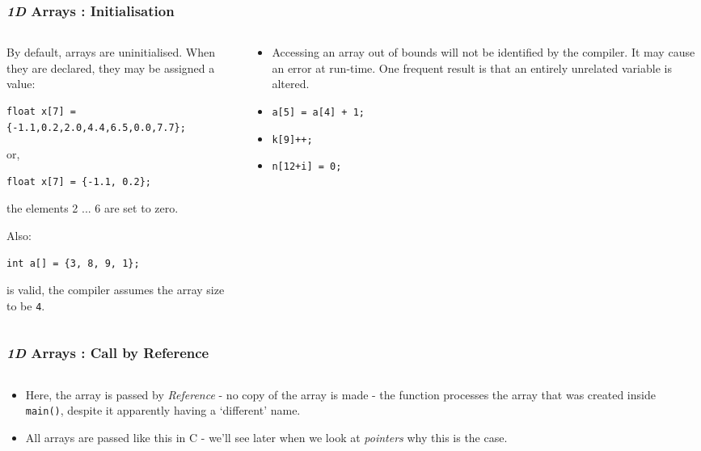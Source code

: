 \begin{frame}[fragile]
\frametitle{{\em 1D} Arrays : Initialisation}
\begin{columns}

\begin{column}{0.45\textwidth}
By default, arrays are uninitialised.
When they are declared, they may be assigned a value:
{\small
\begin{verbatim}
float x[7] = {-1.1,0.2,2.0,4.4,6.5,0.0,7.7};
\end{verbatim}
}
or,
{\small
\begin{verbatim}
float x[7] = {-1.1, 0.2};
\end{verbatim}
}
the elements 2 ... 6 are set to zero.

Also:
{\small
\begin{verbatim}
int a[] = {3, 8, 9, 1};
\end{verbatim}
}
is valid, the compiler assumes the array size to be \verb^4^.
\end{column}

\begin{column}{0.45\textwidth}
\begin{itemize}
\item Accessing an array out of bounds will not be identified by
the compiler. It may cause an error at run-time.
One frequent result is that an entirely unrelated variable
is altered.
\item \verb^a[5] = a[4] + 1;^
\item \verb^k[9]++;^
\item \verb^n[12+i] = 0;^
\end{itemize}
\end{column}

\end{columns}
\end{frame}



\begin{frame}[fragile]
\frametitle{{\em 1D} Arrays : Call by Reference}
\begin{columns}

\begin{column}{0.35\textwidth}
\begin{itemize}
\item Here, the array is passed by {\em Reference} - no copy of
the array is made - the function processes the array that was created inside \verb^main()^, despite
it apparently having a `different' name.
\item All arrays are passed like this in C - we'll see later when we look at {\em pointers} why this is the case.
\end{itemize}
\end{column}

\begin{column}{0.55\textwidth}

\end{column}

\end{columns}
\end{frame}




